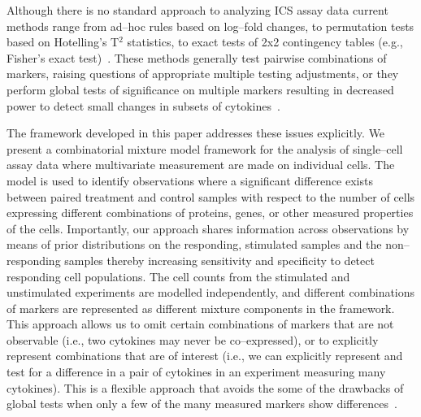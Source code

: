 \documentclass[11pt]{article}
\begin{document}
Although there is no standard approach to analyzing ICS assay data current methods range from ad--hoc rules based on log--fold changes, to permutation tests based on Hotelling's T$^2$ statistics, to exact tests of 2x2 contingency tables (e.g., Fisher's exact test)~\cite{Trigona:2003,Sinclair:2004hs,Horton:2007tsa,Nason:2006dx}. These methods generally test pairwise combinations of markers, raising questions of appropriate multiple testing adjustments, or they perform global tests of significance on multiple markers resulting in decreased power to detect small changes in subsets of cytokines~\cite{Proschan:2009ks,Nason:2006dx}. 



The framework developed in this paper addresses these issues explicitly. We present a combinatorial mixture model framework for the analysis of single--cell assay data where multivariate measurement are made on individual cells. The model is used to identify observations where a significant difference exists between paired treatment and control samples with respect to the number of cells expressing  different combinations of proteins, genes, or other measured properties of the cells. Importantly, our approach shares information across observations by means of prior distributions on the responding, stimulated samples and the non--responding samples thereby increasing sensitivity and specificity to detect responding cell populations. The cell counts from the stimulated and unstimulated experiments are modelled independently, and different combinations of markers are represented as different mixture components in the framework. This approach allows us to omit certain combinations of markers that are not observable (i.e., two cytokines may never be co--expressed), or to explicitly represent combinations that are of interest (i.e., we can explicitly represent and test for a difference in a pair of cytokines in an experiment measuring many cytokines). This is a flexible approach that avoids the some of the drawbacks of global tests when only a few of the many measured markers show differences~\cite{Nason:2006dx}.
\end{document}
